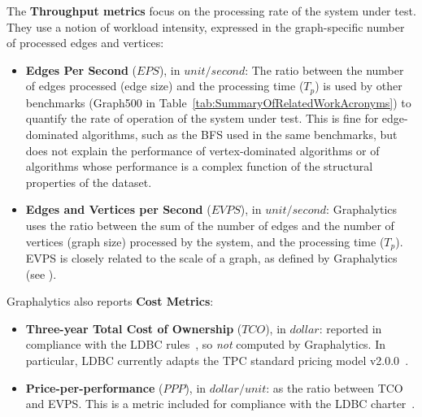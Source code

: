 The {\bf Throughput metrics} focus on the processing rate of the system under test. They use a notion of workload intensity, expressed in the graph-specific number of processed edges and vertices:
\begin{itemize}
	\item {\bf Edges Per Second} ($EPS$), in $unit / second$: The ratio between the number of edges processed (edge size) and the processing time ($T_p$) is used by other benchmarks (Graph500 in Table~\ref{tab:SummaryOfRelatedWorkAcronyms}) to quantify the rate of operation of the system under test. This is fine for edge-dominated algorithms, such as the BFS used in the same benchmarks, but does not explain the performance of vertex-dominated algorithms or of algorithms whose performance is a complex function of the structural properties of the dataset.
	
	\item {\bf Edges and Vertices per Second} ($EVPS$), in $unit / second$: Graphalytics uses the ratio between the sum of the number of edges and the number of vertices (graph size) processed by the system, and the processing time ($T_p$). EVPS is closely related to the scale of a graph, as defined by Graphalytics (see ).
\end{itemize}

Graphalytics also reports {\bf Cost Metrics}:

\begin{itemize}
	\item {\bf Three-year Total Cost of Ownership} ($TCO$), in $dollar$: reported in compliance with the LDBC rules~\cite{ldbc_byelaws}, so {\it not} computed by Graphalytics. In particular, LDBC currently adapts the TPC standard pricing model v2.0.0~\cite{tpc_pricing}.
	
	\item {\bf Price-per-performance} ($PPP$), in $dollar / unit$: as the ratio between TCO and EVPS. This is a metric included for compliance with the LDBC charter~\cite{ldbc_byelaws}.

	

\end{itemize}



